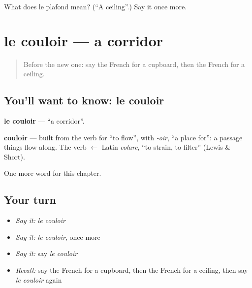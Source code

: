 \begin{tcolorbox}[breakable,colback=teal!4,colframe=teal!35!black,title={Before you move on}]
What does le plafond mean? (\textquotedblleft{}A ceiling\textquotedblright{}.) Say it once more.
\end{tcolorbox}
\section[le couloir]{le couloir — a corridor}

\label{lesson:FR-C76-couloir}



\begin{quote}
Before the new one: say the French for a cupboard, then the French for a ceiling.
\end{quote}

\subsection*{You'll want to know: le couloir}
\textbf{le couloir} — \textquotedblleft{}a corridor\textquotedblright{}.

\begin{cousinweb}
\textbf{couloir} — built from the verb for \textquotedblleft{}to flow\textquotedblright{}, with \emph{-oir}, \textquotedblleft{}a place for\textquotedblright{}: a passage things flow along. The verb $\leftarrow$ Latin \emph{colare}, \textquotedblleft{}to strain, to filter\textquotedblright{} (Lewis \& Short).
\end{cousinweb}

\begin{grammarlens}[title={What you've built}]
One more word for this chapter.
\end{grammarlens}

\subsection*{Your turn}
\begin{itemize}
\raggedright
  \item \emph{Say it:} \emph{le couloir}
  \item \emph{Say it:} \emph{le couloir}, once more
  \item \emph{Say it:} say \emph{le couloir}
  \item \emph{Recall:} say the French for a cupboard, then the French for a ceiling, then say \emph{le couloir} again
\end{itemize}

